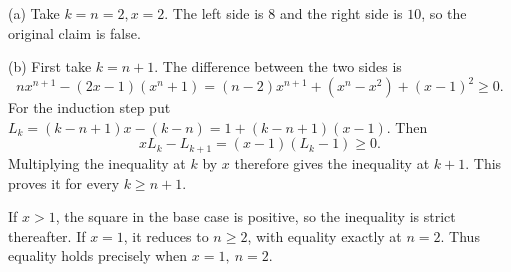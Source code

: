 (a) Take $k=n=2,x=2$. The left side is $8$ and the right side is $10$, so the original claim is false.

(b) First take $k=n+1$. The difference between the two sides is
\[
nx^{n+1}-(2x-1)(x^n+1)
=(n-2)x^{n+1}+(x^n-x^2)+(x-1)^2\ge0.
\]
For the induction step put $L_k=(k-n+1)x-(k-n)=1+(k-n+1)(x-1)$. Then
\[
xL_k-L_{k+1}=(x-1)(L_k-1)\ge0.
\]
Multiplying the inequality at $k$ by $x$ therefore gives the inequality at $k+1$. This proves it for every $k\ge n+1$.

If $x>1$, the square in the base case is positive, so the inequality is strict thereafter. If $x=1$, it reduces to $n\ge2$, with equality exactly at $n=2$. Thus equality holds precisely when $\boxed{x=1,\ n=2}$.
